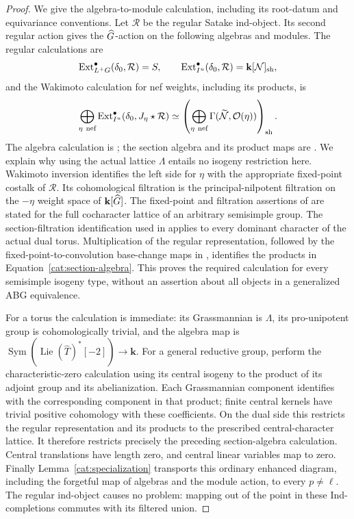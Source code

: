 \begin{proof}
We give the algebra-to-module calculation, including its root-datum
and equivariance conventions. Let $\mathcal R$ be the regular Satake
ind-object. Its second regular action gives the $\widehat G$-action on the
following algebras and modules. The regular calculations are
\[
 \operatorname{Ext}^{\bullet}_{L^+G}(\delta_0,\mathcal R)=S,
 \qquad
 \operatorname{Ext}^{\bullet}_{I^u}(\delta_0,\mathcal R)
       =\mathbf k[\mathcal N]_{\rm sh},
\]
and the Wakimoto calculation for nef weights, including its products, is
\begin{equation}\label{cat:section-algebra}
 \bigoplus_{\eta\ \text{nef}}
 \operatorname{Ext}^{\bullet}_{I^u}
            (\delta_0,J_\eta\star\mathcal R)
 \simeq
 \left(\bigoplus_{\eta\ \text{nef}}
       \Gamma(\widetilde{\mathcal N},\mathcal O(\eta))\right)_{\rm sh}.
\end{equation}
The algebra calculation is
\cite[Theorems~7.3.1 and 7.6.1]{ABG}; the section algebra and its
product maps are \cite[Theorem~8.5.2 and Equations~(8.7.2)--(8.7.8)]{ABG}.
We explain why using the actual lattice $\Lambda$ entails no
isogeny restriction here. Wakimoto inversion identifies the left
side for $\eta$ with the appropriate fixed-point costalk of
$\mathcal R$. Its cohomological filtration is the principal-nilpotent
filtration on the $-\eta$ weight space of $\mathbf k[\widehat G]$.
The fixed-point and filtration assertions of
\cite[Propositions~5.5.2 and 5.6.2]{GinzburgLoop} are stated for the
full cocharacter lattice of an arbitrary semisimple group.
The section-filtration identification used in
\cite[Equations~(8.6.2)--(8.6.3)]{ABG} applies to every dominant
character of the actual dual torus. Multiplication of the regular representation,
followed by the fixed-point-to-convolution base-change maps in
\cite[Equations~(8.7.6)--(8.7.8)]{ABG}, identifies the products in
Equation~\eqref{cat:section-algebra}. This proves the required
calculation for every semisimple isogeny type, without an assertion
about all objects in a generalized ABG equivalence.

For a torus the calculation is immediate: its Grassmannian is
$\Lambda$, its pro-unipotent group is cohomologically trivial, and
the algebra map is $\operatorname{Sym}(\operatorname{Lie}(\widehat
T)^*[-2])\to\mathbf k$. For a general reductive group, perform
the characteristic-zero calculation using its central isogeny to
the product of its adjoint group and its abelianization. Each
Grassmannian component identifies with the corresponding component
in that product; finite central kernels have trivial positive
cohomology with these coefficients. On the dual side this restricts
the regular representation and its products to the prescribed
central-character lattice. It therefore restricts precisely the
preceding section-algebra calculation. Central translations have
length zero, and central linear variables map to zero. Finally
Lemma~\ref{cat:specialization} transports this ordinary enhanced
diagram, including the forgetful map of algebras and the module
action, to every $p\ne\ell$. The regular ind-object causes no
problem: mapping out of the point in these Ind-completions commutes
with its filtered union.


\end{proof}
